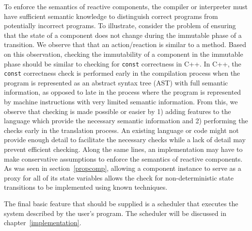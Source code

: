 To enforce the semantics of reactive components, the compiler or interpreter must have sufficient semantic knowledge to distinguish correct programs from potentially incorrect programs.
To illustrate, consider the problem of ensuring that the state of a component does not change during the immutable phase of a transition.
We observe that that an action/reaction is similar to a method.
Based on this observation, checking the immutability of a component in the immutable phase should be similar to checking for \verb+const+ correctness in C++.
In C++, the \verb+const+ correctness check is performed early in the compilation process when the program is represented as an abstract syntax tree (AST) with full semantic information, as opposed to late in the process where the program is represented by machine instructions with very limited semantic information.
From this, we observe that checking is made possible or easier by 1) adding features to the language which provide the necessary semantic information and 2) performing the checks early in the translation process.
An existing language or code might not provide enough detail to facilitate the necessary checks while a lack of detail may prevent efficient checking.
Along the same lines, an implementation may have to make conservative assumptions to enforce the semantics of reactive components.
As was seen in section~\ref{propcomp}, allowing a component instance to serve as a proxy for all of its state variables allows the check for non-deterministic state transitions to be implemented using known techniques.

The final basic feature that should be supplied is a scheduler that executes the system described by the user's program.
The scheduler will be discussed in chapter~\ref{implementation}.

